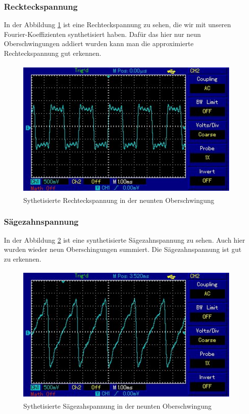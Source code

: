 \subsubsection{Reckteckspannung}
In der Abbildung \ref{fig:sr} ist eine Rechteckspannung zu sehen, die wir mit
unseren Fourier-Koeffizienten synthetisiert haben. Dafür das hier nur neun Oberschwingungen
addiert wurden kann man die approximierte Rechteckspannung gut erkennen.
\begin{figure}
  \centering
  \includegraphics[height=7cm]{Prints/10.jpg}
  \caption{Sythetisierte Rechteckspannung in der neunten Oberschwingung}
  \label{fig:sr}
\end{figure}
\FloatBarrier
\subsubsection{Sägezahnspannung}
In der Abbildung \ref{fig:sd} ist eine synthetisierte Sägezahnspannung zu sehen. Auch hier
wurden wieder neun Oberschingungen summiert. Die Sägezahnspannung ist gut zu erkennen.
\begin{figure}
  \centering
  \includegraphics[height=7cm]{Prints/12.jpg}
  \caption{Sythetisierte Sägezahspannung in der neunten Oberschwingung}
  \label{fig:sd}
\end{figure}
\FloatBarrier
